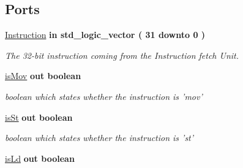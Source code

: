 \subsection*{Ports}
 \begin{DoxyCompactItemize}
\item 
\hypertarget{class_c_unit_a187326d2b4b17c46dcaeead2064c8c82}{\hyperlink{class_c_unit_a187326d2b4b17c46dcaeead2064c8c82}{Instruction}  {\bfseries {\bfseries \textcolor{vhdlkeyword}{in}\textcolor{vhdlchar}{ }}} {\bfseries \textcolor{comment}{std\-\_\-logic\-\_\-vector}\textcolor{vhdlchar}{ }\textcolor{vhdlchar}{(}\textcolor{vhdlchar}{ } \textcolor{vhdldigit}{31} \textcolor{vhdlchar}{ }\textcolor{vhdlchar}{ }\textcolor{vhdlchar}{ }\textcolor{vhdlkeyword}{downto}\textcolor{vhdlchar}{ }\textcolor{vhdlchar}{ }\textcolor{vhdlchar}{ } \textcolor{vhdldigit}{0} \textcolor{vhdlchar}{ }\textcolor{vhdlchar}{)}\textcolor{vhdlchar}{ }} }\label{class_c_unit_a187326d2b4b17c46dcaeead2064c8c82}

\begin{DoxyCompactList}\small\item\em The 32-\/bit instruction coming from the Instruction fetch Unit. \end{DoxyCompactList}\item 
\hypertarget{class_c_unit_a81134d903eb6d6b92bfee5560162a63a}{\hyperlink{class_c_unit_a81134d903eb6d6b92bfee5560162a63a}{is\-Mov}  {\bfseries {\bfseries \textcolor{vhdlkeyword}{out}\textcolor{vhdlchar}{ }}} {\bfseries \textcolor{comment}{boolean}\textcolor{vhdlchar}{ }} }\label{class_c_unit_a81134d903eb6d6b92bfee5560162a63a}

\begin{DoxyCompactList}\small\item\em boolean which states whether the instruction is 'mov' \end{DoxyCompactList}\item 
\hypertarget{class_c_unit_acf493c1820670da4fa6e856436fae09c}{\hyperlink{class_c_unit_acf493c1820670da4fa6e856436fae09c}{is\-St}  {\bfseries {\bfseries \textcolor{vhdlkeyword}{out}\textcolor{vhdlchar}{ }}} {\bfseries \textcolor{comment}{boolean}\textcolor{vhdlchar}{ }} }\label{class_c_unit_acf493c1820670da4fa6e856436fae09c}

\begin{DoxyCompactList}\small\item\em boolean which states whether the instruction is 'st' \end{DoxyCompactList}\item 
\hypertarget{class_c_unit_ad35c473f9f330123d545e49e48459bec}{\hyperlink{class_c_unit_ad35c473f9f330123d545e49e48459bec}{is\-Ld}  {\bfseries {\bfseries \textcolor{vhdlkeyword}{out}\textcolor{vhdlchar}{ }}} {\bfseries \textcolor{comment}{boolean}\textcolor{vhdlchar}{ }} }\label{class_c_unit_ad35c473f9f330123d545e49e48459bec}


\end{DoxyCompactItemize}
